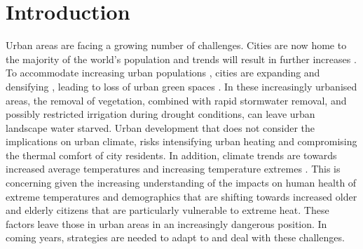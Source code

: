 \documentclass[final,3p,times,authoryear]{elsarticle}
\begin{document}
\begin{table}[!t]   
\begin{framed}
\printnomenclature
%
\end{framed}
\end{table}





\section{Introduction}\label{sec:introduction}
Urban areas are facing a growing number of challenges. Cities are now home to the majority of the world's population and trends will result in further increases \citep{UNDESA2015,WHO2016}. To accommodate increasing urban populations \citep{ABS2008}, cities are expanding \citep{Seto2011} and densifying \citep{Byrne2016,Ruth2016,DSE2002}, leading to loss of urban green spaces \citep{Hamin2009,Coutts2007}. In these increasingly urbanised areas, the removal of vegetation, combined with rapid stormwater removal, and possibly restricted irrigation during drought conditions, can leave urban landscape water starved. Urban development that does not consider the implications on urban climate, risks intensifying urban heating and compromising the thermal comfort of city residents. In addition, climate trends are towards increased average temperatures and increasing temperature extremes \citep{Alexander2009,IPCC2013a}. This is concerning given the increasing understanding of the impacts on human health of extreme temperatures \citep{Katsouyanni1993,Nicholls2008,Loughnan2010} and demographics that are shifting towards increased older and elderly citizens \citep{Cohen2003,FIFARS2016} that are particularly vulnerable to extreme heat. These factors leave those in urban areas in an increasingly dangerous position. In coming years, strategies are needed to adapt to and deal with these challenges.
\end{document}
